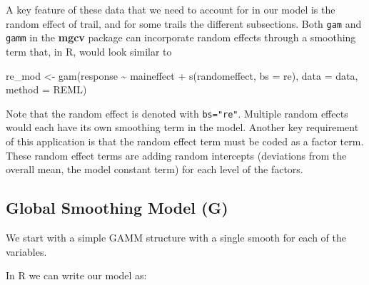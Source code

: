 \documentclass[
]{book}
\newenvironment{Shaded}{\begin{snugshade}}{\end{snugshade}}
\newcommand{\AttributeTok}[1]{\textcolor[rgb]{0.77,0.63,0.00}{#1}}
\newcommand{\FunctionTok}[1]{\textcolor[rgb]{0.00,0.00,0.00}{#1}}
\newcommand{\NormalTok}[1]{#1}
\newcommand{\OtherTok}[1]{\textcolor[rgb]{0.56,0.35,0.01}{#1}}
\newcommand{\SpecialCharTok}[1]{\textcolor[rgb]{0.00,0.00,0.00}{#1}}
\newcommand{\StringTok}[1]{\textcolor[rgb]{0.31,0.60,0.02}{#1}}
\begin{document}
A key feature of these data that we need to account for in our model is the random effect of trail, and for some trails the different subsections. Both \texttt{gam} and \texttt{gamm} in the \textbf{mgcv} package can incorporate random effects through a smoothing term that, in R, would look similar to

\begin{Shaded}
\begin{Highlighting}[]
\NormalTok{re\_mod }\OtherTok{\textless{}{-}} \FunctionTok{gam}\NormalTok{(response }\SpecialCharTok{\textasciitilde{}}\NormalTok{ maineffect }\SpecialCharTok{+}
                \FunctionTok{s}\NormalTok{(randomeffect, }\AttributeTok{bs =} \StringTok{\textquotesingle{}re\textquotesingle{}}\NormalTok{),}
              \AttributeTok{data =}\NormalTok{ data,}
              \AttributeTok{method =} \StringTok{\textquotesingle{}REML\textquotesingle{}}\NormalTok{)}
\end{Highlighting}
\end{Shaded}

Note that the random effect is denoted with \texttt{bs="re"}. Multiple random effects would each have its own smoothing term in the model. Another key requirement of this application is that the random effect term must be coded as a factor term. These random effect terms are adding random intercepts (deviations from the overall mean, the model constant term) for each level of the factors.

\hypertarget{global-smoothing-model-g}{%
\subsection{Global Smoothing Model (G)}\label{global-smoothing-model-g}}

We start with a simple GAMM structure with a single smooth for each of the variables.

In R we can write our model as:
\end{document}
